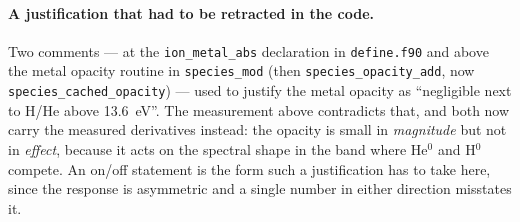 \documentclass[english,a4paper]{my_memo}
\newcommand{\code}[1]{\texttt{#1}}
\begin{document}
\paragraph{A justification that had to be retracted in the code.}  Two
comments --- at the \code{ion\_metal\_abs} declaration in \code{define.f90}
and above the metal opacity routine in \code{species\_mod} (then
\code{species\_opacity\_add}, now \code{species\_cached\_opacity}) --- used to
justify the metal opacity
as ``negligible next to H/He above 13.6~eV''.  The measurement above
contradicts that, and both now carry the measured derivatives instead: the
opacity is small in \emph{magnitude} but not in \emph{effect}, because it
acts on the spectral shape in the band where He$^0$ and H$^0$ compete.  An
on/off statement is the form such a justification has to take here, since
the response is asymmetric and a single number in either direction
misstates it.
\end{document}
